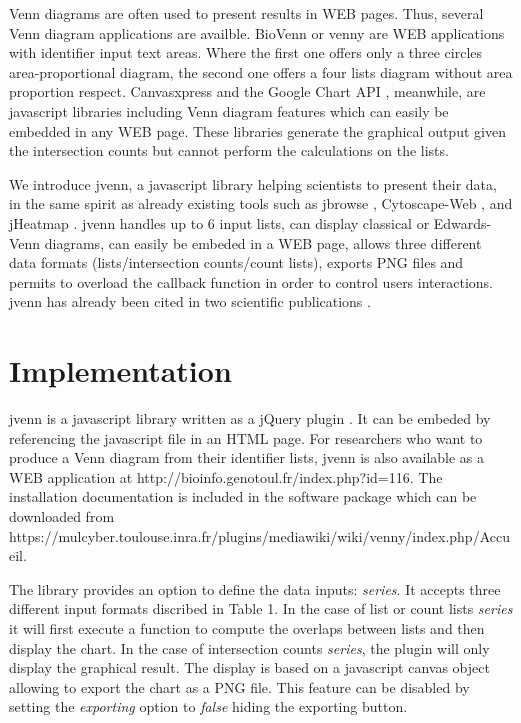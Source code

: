 \documentclass{bmcart}
\begin{document}
Venn diagrams are often used to present results in WEB pages. Thus, several Venn diagram applications are 
availble. BioVenn \cite{Hulsen2008} or venny \cite{venny} are WEB applications with identifier input text 
areas. Where the first one offers only a three circles area-proportional diagram, the second one offers a 
four lists diagram without area proportion respect. Canvasxpress \cite{canvasxpress} and the Google Chart 
API \cite{googleAPI}, meanwhile, are javascript libraries including Venn diagram features which can easily 
be embedded in any WEB page. These libraries generate the graphical output given the intersection counts but 
cannot perform the calculations on the lists.

We introduce jvenn, a javascript library helping scientists to present their data, in the same spirit as already 
existing tools such as jbrowse \cite{Westesson01032013}, Cytoscape-Web \cite{Lopes2010}, and jHeatmap \cite{DeuPons2014}. 
jvenn handles up to 6 input lists, can display classical or Edwards-Venn \cite{Edwards2004} diagrams, can easily be 
embeded in a WEB page, allows three different data formats (lists/intersection counts/count lists), exports PNG files and permits 
to overload the callback function in order to control users interactions. jvenn has already been cited in two scientific 
publications \cite{Bianchia2013, Aravindraja2013}.


\section*{Implementation}

jvenn is a javascript library written as a jQuery plugin \cite{jquery}. It can be embeded by referencing the javascript file 
in an HTML page. For researchers who want to produce a Venn diagram from their identifier lists, jvenn is also available as a 
WEB application at http://bioinfo.genotoul.fr/index.php?id=116. The installation documentation is included in the software package 
which can be downloaded from https://mulcyber.toulouse.inra.fr/plugins/mediawiki/wiki/venny/index.php/Accueil.

The library provides an option to define the data inputs: \textit{series}. It accepts three different input formats discribed in 
Table 1. In the case of list or count lists \textit{series} it will first execute a function to compute the overlaps between lists and then
display the chart. In the case of intersection counts \textit{series}, the plugin will only display the graphical result. The display 
is based on a javascript canvas object allowing to export the chart as a PNG file. This feature can be disabled by setting the \textit{exporting} 
option to \textit{false} hiding the exporting button.
\end{document}
